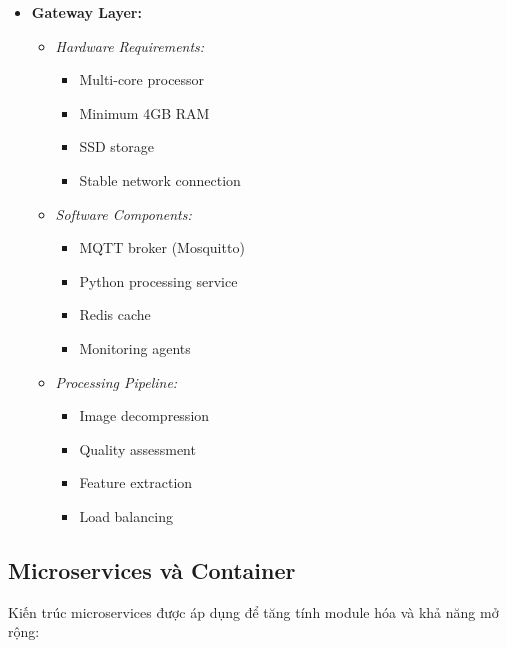 \begin{itemize}
    \item \textbf{Gateway Layer:}
    \begin{itemize}
        \item \textit{Hardware Requirements:}
        \begin{itemize}
            \item Multi-core processor
            \item Minimum 4GB RAM
            \item SSD storage
            \item Stable network connection
        \end{itemize}
        \item \textit{Software Components:}
        \begin{itemize}
            \item MQTT broker (Mosquitto)
            \item Python processing service
            \item Redis cache
            \item Monitoring agents
        \end{itemize}
        \item \textit{Processing Pipeline:}
        \begin{itemize}
            \item Image decompression
            \item Quality assessment
            \item Feature extraction
            \item Load balancing
        \end{itemize}
    \end{itemize}
\end{itemize}

\subsection{Microservices và Container}
\hspace{0.5cm}Kiến trúc microservices được áp dụng để tăng tính module hóa và khả năng mở rộng:

